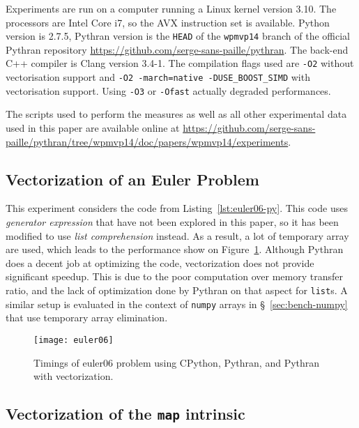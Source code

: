 \documentclass[preprint]{sigplanconf}
\begin{document}
Experiments are run on a computer running a Linux kernel version 3.10. The
processors are Intel Core i7, so the AVX instruction set is available. Python
version is 2.7.5, Pythran version is the \texttt{HEAD} of the \texttt{wpmvp14}
branch of the official Pythran repository
\url{https://github.com/serge-sans-paille/pythran}. The back-end C++ compiler is
Clang version 3.4-1. The compilation flags used are \texttt{-O2} without
vectorisation support and \texttt{-O2 -march=native -DUSE\_BOOST\_SIMD} with
vectorisation support. Using \texttt{-O3} or \texttt{-Ofast} actually degraded
performances.

The scripts used to perform the measures as well as all other experimental data
used in this paper are available online at
\url{https://github.com/serge-sans-paille/pythran/tree/wpmvp14/doc/papers/wpmvp14/experiments}.



\subsection{Vectorization of an Euler Problem}

This experiment considers the code from Listing~\ref{lst:euler06-py}. This code
uses \emph{generator expression} that have not been explored in this paper, so
it has been modified to use \emph{list comprehension} instead. As a result, a
lot of temporary array are used, which leads to the performance show on
Figure~\ref{fig:euler06-timings}. Although Pythran does a decent job at
optimizing the code, vectorization does not provide significant speedup. This
is due to the poor computation over memory transfer ratio, and the lack of
optimization done by Pythran on that aspect for \texttt{list}s. A similar setup
is evaluated in the context of \texttt{numpy} arrays in
\S~\ref{sec:bench-numpy} that use temporary array elimination.

\begin{figure}[ht]

    \texttt{[image: euler06]}
    \caption{Timings of euler06 problem using CPython, Pythran, and Pythran with vectorization.}
    \label{fig:euler06-timings}

\end{figure}

\subsection{Vectorization of the \texttt{map} intrinsic}
\end{document}
